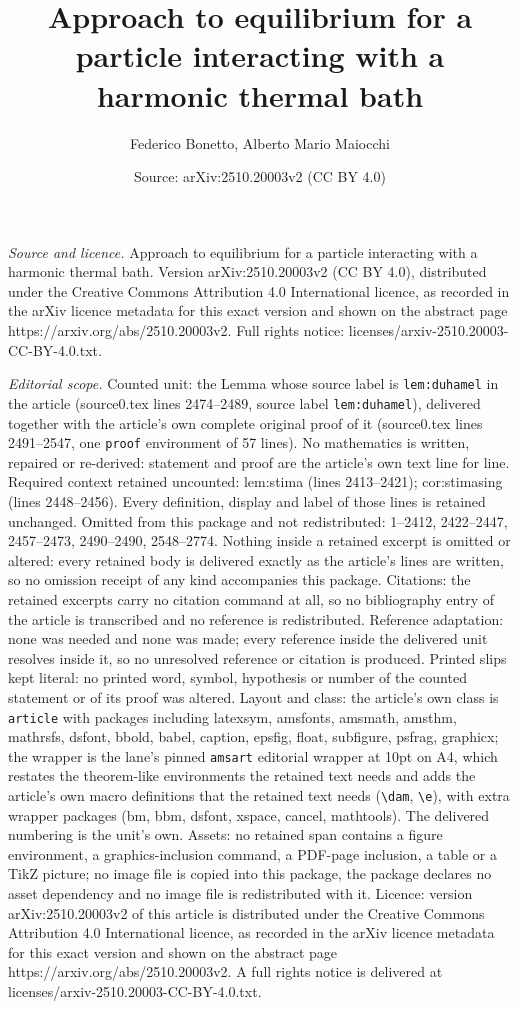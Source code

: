\documentclass[10pt,a4paper]{amsart}
\title[Approach to equilibrium for a particle interacting with a ha]{Approach to equilibrium for a particle interacting with a harmonic thermal bath}
\author{Federico Bonetto, Alberto Mario Maiocchi}
\date{Source: arXiv:2510.20003v2 (CC BY 4.0)}
\begin{document}
\maketitle

\noindent\emph{Source and licence.} Approach to equilibrium for a particle interacting with a harmonic thermal bath. Version arXiv:2510.20003v2 (CC BY 4.0), distributed under the Creative Commons Attribution 4.0 International licence, as recorded in the arXiv licence metadata for this exact version and shown on the abstract page https://arxiv.org/abs/2510.20003v2. Full rights notice: licenses/arxiv-2510.20003-CC-BY-4.0.txt.\par\smallskip

\noindent\textit{Editorial scope.} Counted unit: the Lemma whose source label is \texttt{lem:duhamel} in the article (source0.tex lines 2474--2489, source label \texttt{lem:duhamel}), delivered together with the article's own complete original proof of it (source0.tex lines 2491--2547, one \texttt{proof} environment of 57 lines). No mathematics is written, repaired or re-derived: statement and proof are the article's own text line for line. Required context retained uncounted: lem:stima (lines 2413--2421); cor:stimasing (lines 2448--2456). Every definition, display and label of those lines is retained unchanged. Omitted from this package and not redistributed: 1--2412, 2422--2447, 2457--2473, 2490--2490, 2548--2774. Nothing inside a retained excerpt is omitted or altered: every retained body is delivered exactly as the article's lines are written, so no omission receipt of any kind accompanies this package. Citations: the retained excerpts carry no citation command at all, so no bibliography entry of the article is transcribed and no reference is redistributed. Reference adaptation: none was needed and none was made; every reference inside the delivered unit resolves inside it, so no unresolved reference or citation is produced. Printed slips kept literal: no printed word, symbol, hypothesis or number of the counted statement or of its proof was altered. Layout and class: the article's own class is \texttt{article} with packages including latexsym, amsfonts, amsmath, amsthm, mathrsfs, dsfont, bbold, babel, caption, epsfig, float, subfigure, psfrag, graphicx; the wrapper is the lane's pinned \texttt{amsart} editorial wrapper at 10pt on A4, which restates the theorem-like environments the retained text needs and adds the article's own macro definitions that the retained text needs (\texttt{\textbackslash dam}, \texttt{\textbackslash e}), with extra wrapper packages (bm, bbm, dsfont, xspace, cancel, mathtools). The delivered numbering is the unit's own. Assets: no retained span contains a figure environment, a graphics-inclusion command, a PDF-page inclusion, a table or a TikZ picture; no image file is copied into this package, the package declares no asset dependency and no image file is redistributed with it. Licence: version arXiv:2510.20003v2 of this article is distributed under the Creative Commons Attribution 4.0 International licence, as recorded in the arXiv licence metadata for this exact version and shown on the abstract page https://arxiv.org/abs/2510.20003v2. A full rights notice is delivered at licenses/arxiv-2510.20003-CC-BY-4.0.txt. 
\end{document}
